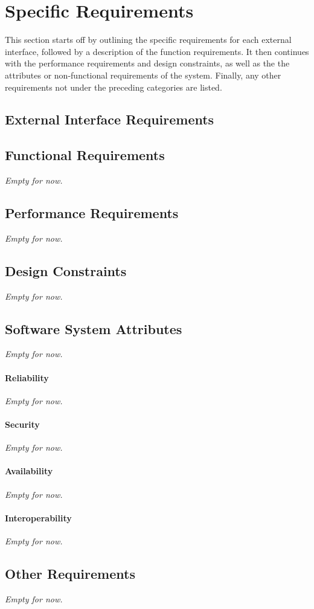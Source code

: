 \section{Specific Requirements}
	This section starts off by outlining the specific requirements for each external interface, followed by a description of the function requirements. It then continues with the performance requirements and design constraints, as well as the the attributes or non-functional requirements of the system. Finally, any other requirements not under the preceding categories are listed.
	\subsection{External Interface Requirements}
	
	\subsection{Functional Requirements}
	\textit{Empty for now.}
	
	\subsection{Performance Requirements}
	\textit{Empty for now.}
		
	\subsection{Design Constraints}
	\textit{Empty for now.}
	
	\subsection{Software System Attributes}
	\textit{Empty for now.}
	\paragraph{Reliability}
	\textit{Empty for now.}
	\paragraph{Security}
	\textit{Empty for now.}
	\paragraph{Availability}
	\textit{Empty for now.}
	\paragraph{Interoperability}
	\textit{Empty for now.}
	
	\subsection{Other Requirements}
	\textit{Empty for now.}
	